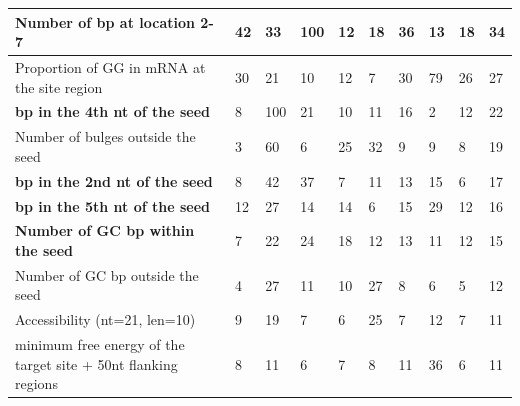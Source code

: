 \documentclass{bmcart}
\begin{document}
\begin{backmatter}
\begin{table}[h!]
\begin{threeparttable}
{\begin{tabular}{|l|l|l|l|l|l|l|l|l|l|}
\textbf{Number of bp at location 2-7\tnote{n}} & 42\tnote{*}           & 33           & 100\tnote{*}          & 12          & 18          & 36\tnote{*}          & 13          & 18          & 34            \\ \hline
Proportion of GG in mRNA at the site region\tnote{n}                            & 30\tnote{*}           & 21           & 10           & 12          & 7           & 30\tnote{*}          & 79\tnote{*}          & 26\tnote{*}          & 27            \\ \hline
\textbf{bp in the 4th nt of the seed\tnote{b}}                    & 8            & 100\tnote{*}          & 21           & 10          & 11          & 16          & 2           & 12          & 22            \\ \hline
Number of bulges outside the seed\tnote{n}                 & 3            & 60\tnote{*}           & 6            & 25\tnote{*}          & 32\tnote{*}          & 9           & 9           & 8           & 19            \\ \hline
\textbf{bp in the 2nd nt of the seed\tnote{b}}                    & 8            & 42           & 37\tnote{*}           & 7           & 11          & 13          & 15          & 6           & 17            \\ \hline
\textbf{bp in the 5th nt of the seed\tnote{b}}                    & 12           & 27           & 14           & 14          & 6           & 15          & 29\tnote{*}          & 12          & 16            \\ \hline
\textbf{Number of GC bp within the seed\tnote{n}}              & 7            & 22           & 24\tnote{*}           & 18\tnote{*}          & 12          & 13          & 11          & 12          & 15            \\ \hline
Number of GC bp outside the seed\tnote{n}                         & 4            & 27           & 11           & 10          & 27\tnote{*}          & 8           & 6           & 5           & 12            \\ \hline
Accessibility (nt=21, len=10)\tnote{n}                                    & 9            & 19           & 7            & 6           & 25          & 7           & 12          & 7           & 11            \\ \hline
minimum free energy of the target site + 50nt flanking regions\tnote{n}            & 8            & 11           & 6            & 7           & 8           & 11          & 36\tnote{*}          & 6           & 11            \\ \hline

\end{tabular}}
\end{threeparttable}
\end{table}
\end{backmatter}
\end{document}

